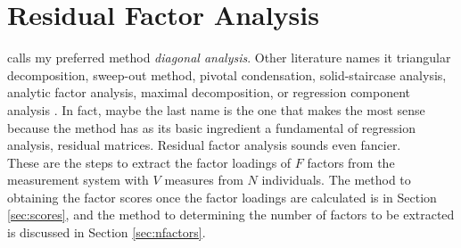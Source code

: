 \section{Residual Factor Analysis} \label{sec:method}
\citet{gorsuch1983factor} calls my preferred method \textit{diagonal analysis}. Other literature names it triangular decomposition, sweep-out method, pivotal condensation, solid-staircase analysis, analytic factor analysis, maximal decomposition, or regression component analysis \citep[see][Chapter 2]{gorsuch1983factor}. In fact, maybe the last name is the one that makes the most sense because the method has as its basic ingredient a fundamental of regression analysis, residual matrices. Residual factor analysis sounds even fancier.\\
\indent These are the steps to extract the factor loadings of $F$ factors from the measurement system with $V$ measures from $N$ individuals. The method to obtaining the factor scores once the factor loadings are calculated is in Section \ref{sec:scores}, and the method to determining the number of factors to be extracted is discussed in Section \ref{sec:nfactors}. 
